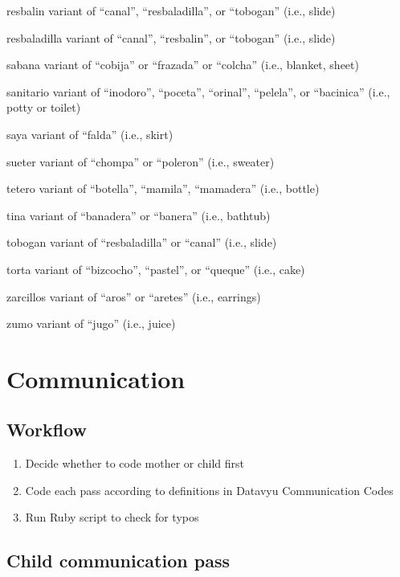 \documentclass[
  12pt,
]{book}
\providecommand{\tightlist}{%
  \setlength{\itemsep}{0pt}\setlength{\parskip}{0pt}}
\begin{document}
resbalin
variant of ``canal'', ``resbaladilla'', or ``tobogan'' (i.e., slide)

resbaladilla
variant of ``canal'', ``resbalin'', or ``tobogan'' (i.e., slide)

sabana
variant of ``cobija'' or ``frazada'' or ``colcha'' (i.e., blanket, sheet)

sanitario
variant of ``inodoro'', ``poceta'', ``orinal'', ``pelela'', or ``bacinica'' (i.e., potty or toilet)

saya
variant of ``falda'' (i.e., skirt)

sueter
variant of ``chompa'' or ``poleron'' (i.e., sweater)

tetero
variant of ``botella'', ``mamila'', ``mamadera'' (i.e., bottle)

tina
variant of ``banadera'' or ``banera'' (i.e., bathtub)

tobogan
variant of ``resbaladilla'' or ``canal'' (i.e., slide)

torta
variant of ``bizcocho'', ``pastel'', or ``queque'' (i.e., cake)

zarcillos
variant of ``aros'' or ``aretes'' (i.e., earrings)

zumo
variant of ``jugo'' (i.e., juice)

\hypertarget{communication}{%
\chapter{Communication}\label{communication}}

\hypertarget{workflow}{%
\section{Workflow}\label{workflow}}

\begin{enumerate}
\def\labelenumi{\arabic{enumi}.}
\tightlist
\item
  Decide whether to code mother or child first
\item
  Code each pass according to definitions in Datavyu Communication Codes
\item
  Run Ruby script to check for typos
\end{enumerate}

\hypertarget{child-communication-pass}{%
\section{Child communication pass}\label{child-communication-pass}}
\end{document}
